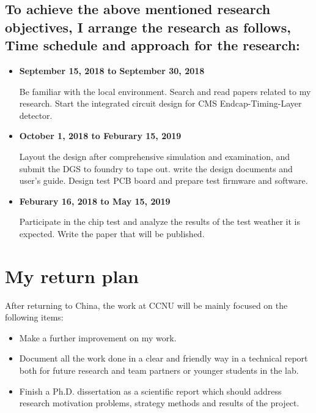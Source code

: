 \documentclass[11pt,a4paper]{article}
\begin{document}
\begin{spacing}{1.2}
\subsection*{To achieve the above mentioned research objectives, I arrange the research as follows, Time schedule and approach for the research:}
\begin{itemize}
    \item \textbf{September 15, 2018 to September 30, 2018}

Be familiar with the local environment. Search and read papers related to my research. Start the integrated circuit design for CMS Endcap-Timing-Layer detector.
    \item \textbf{October 1, 2018 to Feburary 15, 2019}
    
Layout the design after comprehensive simulation and examination, and submit the DGS to foundry to tape out. write the design documents and user's guide. Design test PCB board and prepare test firmware and software.
    \item \textbf{Feburary 16, 2018 to May 15, 2019}

Participate in the chip test and analyze the results of the test weather it is expected. Write the paper that will be published.
\end{itemize}

\section*{My return plan}     %

After returning to China, the work at CCNU will be mainly focused on the following items:
\begin{itemize}
    \item Make a further improvement on my work.
    \item Document all the work done in a clear and friendly way in a technical report both for future research and team partners or younger students in the lab.
    \item Finish a Ph.D. dissertation as a scientific report which should address research motivation problems, strategy methods and results of the project.
\end{itemize}

\vspace{1.5cm}


\vspace{0.5cm}
\end{spacing}
\end{document}
